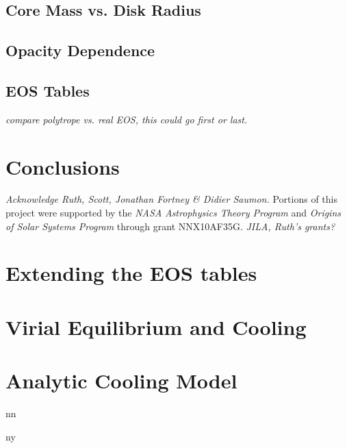 \documentclass[12pt, preprint,numberedappendix]{emulateapj}
\newcommand\submitms{n}		%
\newcommand\bibinc{n}		%
\newcommand{\emgr}[1]{\emph{ \color{gray} #1}}
\begin{document}
\subsection{Core Mass vs. Disk Radius}

\subsection{Opacity Dependence}

\subsection{EOS Tables}
\emgr{compare polytrope vs. real EOS, this could go first or last.}

\section{Conclusions}





\acknowledgements
\emgr{Acknowledge Ruth, Scott, Jonathan Fortney \& Didier Saumon.}  Portions of this project were supported by the {\it NASA} {\it Astrophysics Theory Program} and  {\it Origins of Solar Systems Program}  through grant NNX10AF35G. \emgr{JILA, Ruth's grants?}\\

\appendix
\section{Extending the EOS tables}\label{sec:EOSext}
\section{Virial Equilibrium and Cooling}\label{sec:virial}
\section{Analytic Cooling Model}
\if\bibinc n

\fi

\if\bibinc y
\begin{thebibliography}
\end{thebibliography}
\fi
\end{document}
